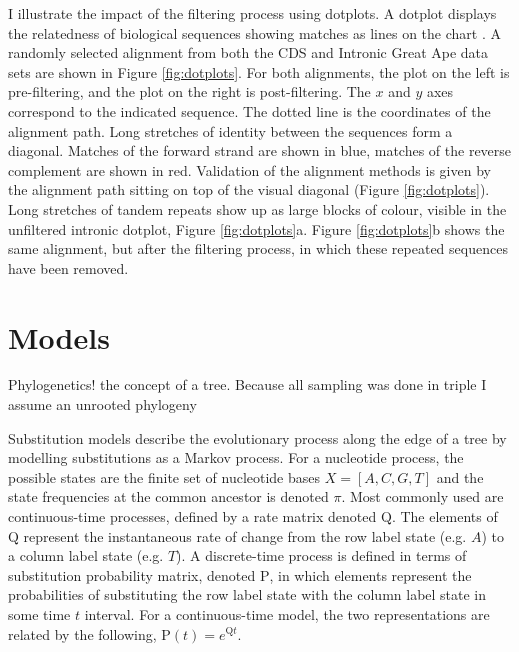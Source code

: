 I illustrate the impact of the filtering process using dotplots. A dotplot displays the relatedness of biological sequences showing matches as lines on the chart \citep{Gibbs1970TheSequences}. A randomly selected alignment from both the CDS and Intronic Great Ape data sets are shown in Figure \ref{fig:dotplots}. For both alignments, the plot on the left is pre-filtering, and the plot on the right is post-filtering. The $x$ and $y$ axes correspond to the indicated sequence. The dotted line is the coordinates of the alignment path. Long stretches of identity between the sequences form a diagonal. Matches of the forward strand are shown in blue, matches of the reverse complement are shown in red. Validation of the alignment methods is given by the alignment path sitting on top of the visual diagonal (Figure \ref{fig:dotplots}). Long stretches of tandem repeats show up as large blocks of colour, visible in the unfiltered intronic dotplot, Figure \ref{fig:dotplots}a. Figure \ref{fig:dotplots}b shows the same alignment, but after the filtering process, in which these repeated sequences have been removed.



\section{Models}

Phylogenetics! the concept of a tree. Because all sampling was done in triple I assume an unrooted phylogeny

Substitution models describe the evolutionary process along the edge of a tree by modelling substitutions as a Markov process. For a nucleotide process, the possible states are the finite set of nucleotide bases $X = [A, C, G, T]$ and the state frequencies at the common ancestor is denoted $\pi$. Most commonly used are continuous-time processes, defined by a rate matrix denoted $\mathrm{Q}$. The elements of $\mathrm{Q}$ represent the instantaneous rate of change from the row label state (e.g. $A$) to a column label state (e.g. $T$). A discrete-time process is defined in terms of substitution probability matrix, denoted $\mathrm{P}$, in which elements represent the probabilities of substituting the row label state with the column label state in some time $t$ interval. For a continuous-time model, the two representations are related by the following, $\mathrm{P}(t) = e^{\mathrm{Q}t}$. 

